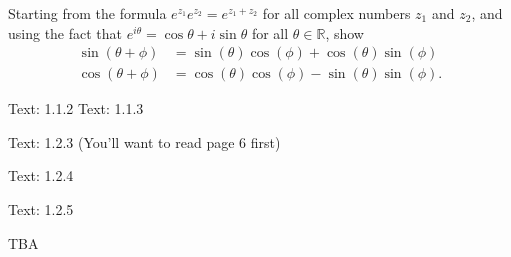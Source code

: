 \documentclass[minion]{homework}
\newcommand{\Reals}{\mathbb{R}}
\begin{document}
\begin{problems}
\problem Starting from the formula $e^{z_1}e^{z_2} = e^{z_1+z_2}$
for all complex numbers $z_1$ and $z_2$, and using the fact
that $e^{i\theta}=\cos\theta+i\sin\theta$ for all $\theta\in\Reals$,
show
\begin{align*}
\sin(\theta+\phi) &= \sin(\theta)\cos(\phi) + \cos(\theta)\sin(\phi)\\
\cos(\theta+\phi) &= \cos(\theta)\cos(\phi) -\sin(\theta) \sin(\phi).
\end{align*}

\problem Text: 1.1.2
\problem Text: 1.1.3

\problem  Text: 1.2.3 (You'll want to read page 6 first)

\problem  Text: 1.2.4

\problem  Text: 1.2.5

\problem TBA

\end{problems}
\end{document}
